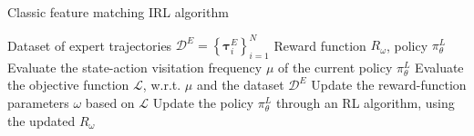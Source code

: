 \begin{algorithm}
\caption{Classic feature matching IRL algorithm}
\label{alg:irl}
\begin{algorithmic}
\REQUIRE Dataset of expert trajectories $\mathcal{D}^{E} = \left \{ \boldsymbol{\tau}^{E}_{i} \right \}^{N}_{i=1}$ 
\REQUIRE Reward function $R_{\omega}$, policy $\pi^{L}_{\theta}$ 
    \STATE Evaluate the state-action visitation frequency $\mu$ of the current policy $\pi^{L}_{\theta}$
    \STATE Evaluate the objective function $\mathcal{L}$, w.r.t. $\mu$ and the dataset $\mathcal{D}^{E}$
    \STATE Update the reward-function parameters $\omega$ based on $\mathcal{L}$
    \STATE Update the policy $\pi^{L}_{\theta}$ through an RL algorithm, using the updated $R_{\omega}$
\ENDWHILE
\end{algorithmic}
\end{algorithm}